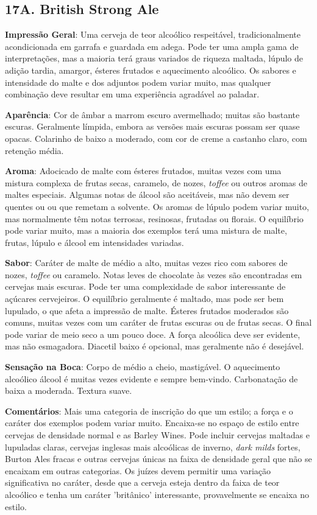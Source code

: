 \subsection*{17A. British Strong Ale}
\textbf{Impressão Geral}: Uma cerveja de teor alcoólico respeitável, tradicionalmente acondicionada em garrafa e guardada em adega. Pode ter uma ampla gama de interpretações, mas a maioria terá graus variados de riqueza maltada, lúpulo de adição tardia, amargor, ésteres frutados e aquecimento alcoólico. Os sabores e intensidade do malte e dos adjuntos podem variar muito, mas qualquer combinação deve resultar em uma experiência agradável ao paladar.

\textbf{Aparência}: Cor de âmbar a marrom escuro avermelhado; muitas são bastante escuras. Geralmente límpida, embora as versões mais escuras possam ser quase opacas. Colarinho de baixo a moderado, com cor de creme a castanho claro, com retenção média.

\textbf{Aroma}: Adocicado de malte com ésteres frutados, muitas vezes com uma mistura complexa de frutas secas, caramelo, de nozes, \textit{toffee} ou outros aromas de maltes especiais. Algumas notas de álcool são aceitáveis, mas não devem ser quentes ou ou que remetam a solvente. Os aromas de lúpulo podem variar muito, mas normalmente têm notas terrosas, resinosas, frutadas ou florais. O equilíbrio pode variar muito, mas a maioria dos exemplos terá uma mistura de malte, frutas, lúpulo e álcool em intensidades variadas.

\textbf{Sabor}: Caráter de malte de médio a alto, muitas vezes rico com sabores de nozes, \textit{toffee} ou caramelo. Notas leves de chocolate às vezes são encontradas em cervejas mais escuras. Pode ter uma complexidade de sabor interessante de açúcares cervejeiros. O equilíbrio geralmente é maltado, mas pode ser bem lupulado, o que afeta a impressão de malte. Ésteres frutados moderados são comuns, muitas vezes com um caráter de frutas escuras ou de frutas secas. O final pode variar de meio seco a um pouco doce. A força alcoólica deve ser evidente, mas não esmagadora. Diacetil baixo é opcional, mas geralmente não é desejável.

\textbf{Sensação na Boca}: Corpo de médio a cheio, mastigável. O aquecimento alcoólico álcool é muitas vezes evidente e sempre bem-vindo. Carbonatação de baixa a moderada. Textura suave.

\textbf{Comentários}: Mais uma categoria de inscrição do que um estilo; a força e o caráter dos exemplos podem variar muito. Encaixa-se no espaço de estilo entre cervejas de densidade normal e as Barley Wines. Pode incluir cervejas maltadas e lupuladas claras, cervejas inglesas mais alcoólicas de inverno, \textit{dark milds} fortes, Burton Ales fracas e outras cervejas únicas na faixa de densidade geral que não se encaixam em outras categorias. Os juízes devem permitir uma variação significativa no caráter, desde que a cerveja esteja dentro da faixa de teor alcoólico e tenha um caráter 'britânico' interessante, provavelmente se encaixa no estilo.

